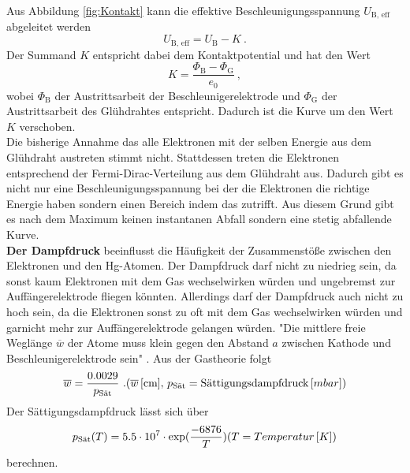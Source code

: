 Aus Abbildung \eqref{fig:Kontakt} kann die effektive Beschleunigungsspannung $U_\text{B, eff}$ abgeleitet werden
\begin{equation*}
	U_\text{B, eff} = U_\text{B} - K \ .
\end{equation*}
Der Summand $K$ entspricht dabei dem Kontaktpotential und hat den Wert
\begin{equation*}
	K = \frac{\Phi_\text{B} - \Phi_\text{G}}{e_0} \ ,
	\label{eqn:K}
\end{equation*}
wobei $\Phi_\text{B}$ der Austrittsarbeit der Beschleunigerelektrode und $\Phi_\text{G}$ der Austrittsarbeit des Glühdrahtes entspricht. Dadurch ist die Kurve um den Wert $K$ verschoben. \\
Die bisherige Annahme das alle Elektronen mit der selben Energie aus dem Glühdraht austreten stimmt nicht. Stattdessen treten die Elektronen entsprechend der Fermi-Dirac-Verteilung aus dem Glühdraht aus. Dadurch gibt es nicht nur eine Beschleunigungsspannung bei der die Elektronen die richtige Energie haben sondern einen Bereich indem das zutrifft. Aus diesem Grund gibt es nach dem Maximum keinen instantanen Abfall sondern eine stetig abfallende Kurve. \\
\textbf{Der Dampfdruck} beeinflusst die Häufigkeit der Zusammenstöße zwischen den Elektronen und den Hg-Atomen. Der Dampfdruck darf nicht zu niedrieg sein, da sonst kaum Elektronen mit dem Gas wechselwirken würden und ungebremst zur Auffängerelektrode fliegen könnten. Allerdings darf der Dampfdruck auch nicht zu hoch sein, da die Elektronen sonst zu oft mit dem Gas wechselwirken würden und garnicht mehr zur Auffängerelektrode gelangen würden. "Die mittlere freie Weglänge $\overline{w}$ der Atome muss klein gegen den Abstand $a$ zwischen Kathode und Beschleunigerelektrode sein" \cite[6]{sample}. Aus der Gastheorie folgt
\begin{equation*}
	\overline{w} = \frac{0.0029}{p_\text{Sät}} \ . \\
	\label{eqn:w}
	(\overline{w}\, [\text{cm}],\, p_\text{Sät} = \text{Sättigungsdampfdruck}\, [mbar])
\end{equation*}
Der Sättigungsdampfdruck lässt sich über
\begin{equation*}
	p_\text{Sät}(T) = 5.5 \cdot 10^7 \cdot \exp(\frac{-6876}{T}) \\
	\label{eqn:p}
	(T = Temperatur\, [K])
\end{equation*}
berechnen.

























